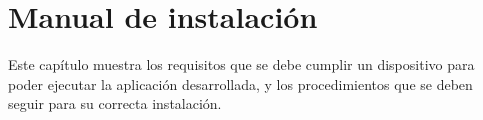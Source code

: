 

\chapter{Manual de instalación}
\thispagestyle{chapterpage}

Este capítulo muestra los requisitos que se debe cumplir un dispositivo
para poder ejecutar la aplicación desarrollada, y los procedimientos 
que se deben seguir para su correcta instalación.




